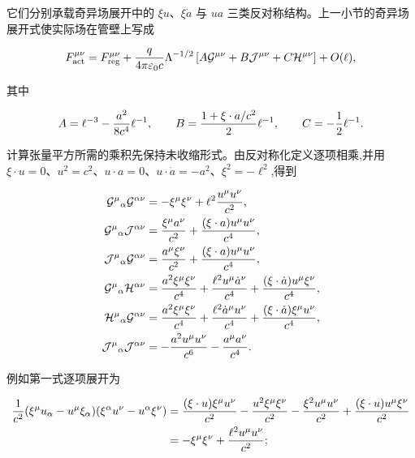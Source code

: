 它们分别承载奇异场展开中的 $\xi u$、$\xi\dot a$ 与 $u a$ 三类反对称结构。上一小节的奇异场展开式使实际场在管壁上写成

\begin{equation*}
 F_{\mathrm{act}}^{\mu\nu}
 =F_{\mathrm{reg}}^{\mu\nu}
 +{q\over4\pi\varepsilon_0c}\Lambda^{-1/2}
 \left[
 A\mathcal G^{\mu\nu}
 +B\mathcal J^{\mu\nu}
 +C\mathcal H^{\mu\nu}
 \right]+O(\ell),
\end{equation*}

其中

\begin{equation*}
 A=\ell^{-3}-{a^2\over8c^4}\ell^{-1},
 \qquad
 B={1+\xi\cdot a/c^2\over2}\ell^{-1},
 \qquad
 C=-{1\over2}\ell^{-1}.
\end{equation*}

计算张量平方所需的乘积先保持未收缩形式。由反对称化定义逐项相乘,并用 $\xi\cdot u=0$、$u^2=c^2$、$u\cdot a=0$、$u\cdot\dot a=-a^2$、$\xi^2=-\ell^2$,得到

\begin{align*}
 \mathcal G^\mu{}_\alpha\mathcal G^{\alpha\nu}
 &=-\xi^\mu\xi^\nu+\ell^2{u^\mu u^\nu\over c^2},\\
 \mathcal G^\mu{}_\alpha\mathcal J^{\alpha\nu}
 &={\xi^\mu a^\nu\over c^2}+{(\xi\cdot a)u^\mu u^\nu\over c^4},\\
 \mathcal J^\mu{}_\alpha\mathcal G^{\alpha\nu}
 &={a^\mu\xi^\nu\over c^2}+{(\xi\cdot a)u^\mu u^\nu\over c^4},\\
 \mathcal G^\mu{}_\alpha\mathcal H^{\alpha\nu}
 &={a^2\xi^\mu\xi^\nu\over c^4}
 +{\ell^2u^\mu\dot a^\nu\over c^4}
 +{(\xi\cdot\dot a)u^\mu\xi^\nu\over c^4},\\
 \mathcal H^\mu{}_\alpha\mathcal G^{\alpha\nu}
 &={a^2\xi^\mu\xi^\nu\over c^4}
 +{\ell^2\dot a^\mu u^\nu\over c^4}
 +{(\xi\cdot\dot a)\xi^\mu u^\nu\over c^4},\\
 \mathcal J^\mu{}_\alpha\mathcal J^{\alpha\nu}
 &=-{a^2u^\mu u^\nu\over c^6}-{a^\mu a^\nu\over c^4}.
\end{align*}

例如第一式逐项展开为

\begin{align*}
 {1\over c^2}(\xi^\mu u_\alpha-u^\mu\xi_\alpha)
 (\xi^\alpha u^\nu-u^\alpha\xi^\nu)
 &={(\xi\cdot u)\xi^\mu u^\nu\over c^2}
 -{u^2\xi^\mu\xi^\nu\over c^2}
 -{\xi^2u^\mu u^\nu\over c^2}
 +{(\xi\cdot u)u^\mu\xi^\nu\over c^2}\\
 &=-\xi^\mu\xi^\nu+{\ell^2u^\mu u^\nu\over c^2};
\end{align*}

